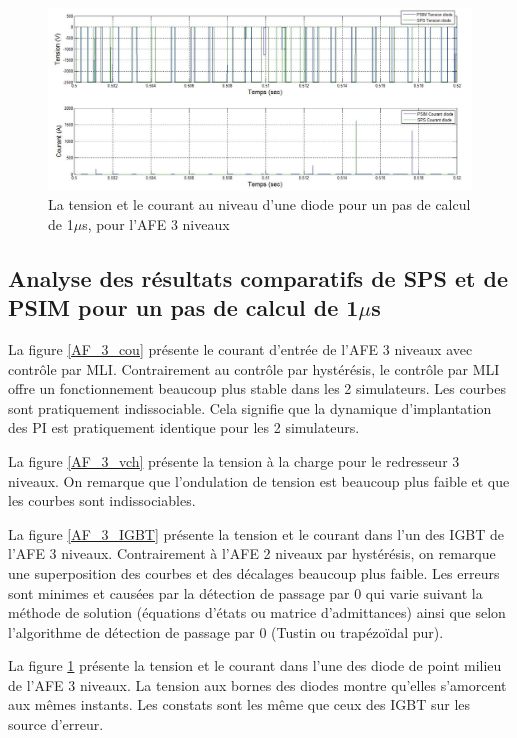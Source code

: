 \begin{figure}[htb]
\centering
\includegraphics[scale=0.5]{fig/AFE3LEVEL/1u/DIODE.jpg}
\caption{La tension et le courant au niveau d'une diode pour un pas de calcul de 1$\mu$s, pour l'AFE 3 niveaux}
\label{AF_3_DIODE}
\end{figure}


\clearpage

\subsection{Analyse des résultats comparatifs de SPS et de PSIM pour un pas de calcul de 1$\mu$s}
La figure \ref{AF_3_cou} présente le courant d'entrée de l'AFE 3 niveaux avec contrôle par MLI. Contrairement au contrôle par hystérésis, le contrôle par MLI offre un fonctionnement beaucoup plus stable dans les 2 simulateurs. Les courbes sont pratiquement indissociable. Cela signifie que la dynamique d'implantation des PI est pratiquement identique pour les 2 simulateurs.

La figure \ref{AF_3_vch} présente la tension à la charge pour le redresseur 3 niveaux. On remarque que l'ondulation de tension est beaucoup plus faible et que les courbes sont indissociables. 

La figure \ref{AF_3_IGBT} présente la tension et le courant dans l'un des IGBT de l'AFE 3 niveaux. Contrairement à l'AFE 2 niveaux par hystérésis, on remarque une superposition des courbes et des décalages beaucoup plus faible. Les erreurs sont minimes et causées par la détection de passage par 0 qui varie suivant la méthode de solution (équations d'états ou matrice d'admittances) ainsi que selon l'algorithme de détection de passage par 0 (Tustin ou trapézoïdal pur).

La figure \ref{AF_3_DIODE} présente la tension et le courant dans l'une des diode de point milieu de l'AFE 3 niveaux. La tension aux bornes des diodes montre qu'elles s'amorcent aux mêmes instants. Les constats sont les même que ceux des IGBT sur les source d'erreur. 
